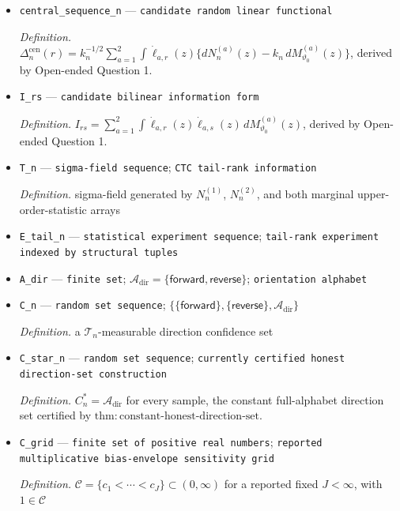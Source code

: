 \documentclass{article}
\begin{document}
\begin{itemize}
  \item \texttt{central\_\allowbreak{}sequence\_\allowbreak{}n} --- \texttt{candidate random linear functional}
  \par\smallskip\noindent\emph{Definition.} \(\mathbb{\Delta}^{\mathrm{cen}}_n(r)=k_n^{-1/2}\sum_{a=1}^2\int\dot\ell_{a,r}(z)\{dN_n^{(a)}(z)-k_n\,dM_{\vartheta_0}^{(a)}(z)\}\), derived by Open-ended Question 1.
  \item \texttt{I\_\allowbreak{}rs} --- \texttt{candidate bilinear information form}
  \par\smallskip\noindent\emph{Definition.} \(I_{rs}=\sum_{a=1}^2\int\dot\ell_{a,r}(z)\dot\ell_{a,s}(z)\,dM_{\vartheta_0}^{(a)}(z)\), derived by Open-ended Question 1.
  \item \texttt{T\_\allowbreak{}n} --- \texttt{sigma-\allowbreak{}field sequence}; \texttt{CTC tail-\allowbreak{}rank information}
  \par\smallskip\noindent\emph{Definition.} sigma-field generated by \(N_n^{(1)}\), \(N_n^{(2)}\), and both marginal upper-order-statistic arrays
  \item \texttt{E\_\allowbreak{}tail\_\allowbreak{}n} --- \texttt{statistical experiment sequence}; \texttt{tail-\allowbreak{}rank experiment indexed by structural tuples}
  \item \texttt{A\_\allowbreak{}dir} --- \texttt{finite set}; \(\mathcal A_{\mathrm{dir}}=\{\mathsf{forward},\mathsf{reverse}\}\); \texttt{orientation alphabet}
  \item \texttt{C\_\allowbreak{}n} --- \texttt{random set sequence}; \(\{\{\mathsf{forward}\},\{\mathsf{reverse}\},\mathcal A_{\mathrm{dir}}\}\)
  \par\smallskip\noindent\emph{Definition.} a \(\mathcal T_n\)-measurable direction confidence set
  \item \texttt{C\_\allowbreak{}star\_\allowbreak{}n} --- \texttt{random set sequence}; \texttt{currently certified honest direction-\allowbreak{}set construction}
  \par\smallskip\noindent\emph{Definition.} \(C_n^*=\mathcal A_{\mathrm{dir}}\) for every sample, the constant full-alphabet direction set certified by \(\mathrm{thm{:}constant\text{-}honest\text{-}direction\text{-}set}\).
  \item \texttt{C\_\allowbreak{}grid} --- \texttt{finite set of positive real numbers}; \texttt{reported multiplicative bias-\allowbreak{}envelope sensitivity grid}
  \par\smallskip\noindent\emph{Definition.} \(\mathcal C=\{c_1<\cdots<c_J\}\subset(0,\infty)\) for a reported fixed \(J<\infty\), with \(1\in\mathcal C\)

\end{itemize}
\end{document}
